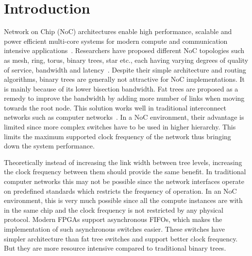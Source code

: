 \section{Introduction}
Network on Chip (NoC) architectures enable high performance, scalable and power efficient multi-core systems for modern compute and communication intensive applications~\cite{Joshi2007,Neeb2005}.
Researchers have proposed different NoC topologies such as mesh, ring, torus, binary trees, star etc., each having varying degrees of quality of service, bandwidth and latency~\cite{Dally2003,Kumar2002}.
Despite their simple architecture and routing algorithms, binary trees are generally not attractive for NoC implementations.
It is mainly because of its lower bisection bandwidth.
Fat trees are proposed as a remedy to improve the bandwidth by adding more number of links when moving towards the root node.
This solution works well in traditional interconnect networks such as computer networks~\cite{Shainer2011}.
In a NoC environment, their advantage is limited since more complex switches have to be used in higher hierarchy.
This limits the maximum supported clock frequency of the network thus bringing down the system performance. 

Theoretically instead of increasing the link width between tree levels, increasing the clock frequency between them should provide the same benefit.
In traditional computer networks this may not be possible since the network interfaces operate on predefined standards which restricts the frequency of operation.
In an NoC environment, this is very much possible since all the compute instances are with in the same chip and the clock frequency is not restricted by any physical protocol. 
Modern FPGAs support asynchronous FIFOs, which makes the implementation of such asynchronous switches easier.
These switches have simpler architecture than fat tree switches and support better clock frequency.
But they are more resource intensive compared to traditional binary trees.

